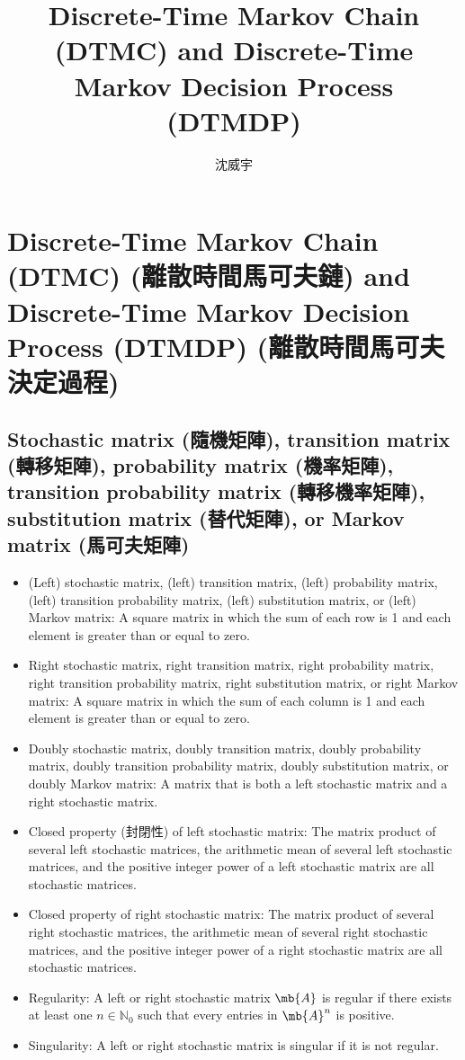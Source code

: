 \documentclass[a4paper,12pt]{report}
\begin{document}
\title{Discrete-Time Markov Chain (DTMC) and Discrete-Time Markov Decision Process (DTMDP)}
\author{沈威宇}
\date{\temtoday}
\titletocdoc
\section{Discrete-Time Markov Chain (DTMC) (離散時間馬可夫鏈) and Discrete-Time Markov Decision Process (DTMDP) (離散時間馬可夫決定過程)}
\subsection{Stochastic matrix (隨機矩陣), transition matrix (轉移矩陣), probability matrix (機率矩陣), transition probability matrix (轉移機率矩陣), substitution matrix (替代矩陣), or Markov matrix (馬可夫矩陣)}
\begin{itemize}
\item (Left) stochastic matrix, (left) transition matrix, (left) probability matrix, (left) transition probability matrix, (left) substitution matrix, or (left) Markov matrix: A square matrix in which the sum of each row is 1 and each element is greater than or equal to zero.
\item Right stochastic matrix, right transition matrix, right probability matrix, right transition probability matrix, right substitution matrix, or right Markov matrix: A square matrix in which the sum of each column is 1 and each element is greater than or equal to zero.
\item Doubly stochastic matrix, doubly transition matrix, doubly probability matrix, doubly transition probability matrix, doubly substitution matrix, or doubly Markov matrix: A matrix that is both a left stochastic matrix and a right stochastic matrix.
\item Closed property (封閉性) of left stochastic matrix: The matrix product of several left stochastic matrices, the arithmetic mean of several left stochastic matrices, and the positive integer power of a left stochastic matrix are all stochastic matrices.
\item Closed property of right stochastic matrix: The matrix product of several right stochastic matrices, the arithmetic mean of several right stochastic matrices, and the positive integer power of a right stochastic matrix are all stochastic matrices.
\item Regularity: A left or right stochastic matrix $\mb{A}$ is regular if there exists at least one $n\in\mathbb{N}_0$ such that every entries in $\mb{A}^n$ is positive.
\item Singularity: A left or right stochastic matrix is singular if it is not regular.
\end{itemize}
\end{document}
